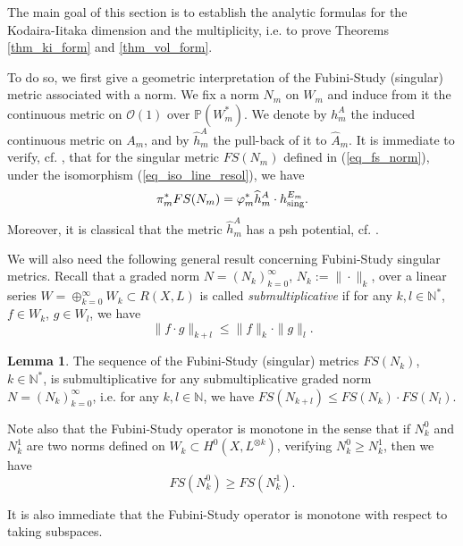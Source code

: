 \documentclass[12pt]{article}
\numberwithin{equation}{section}
\theoremstyle{theorem}
\theoremstyle{definition}
\newtheorem{lem}[thm]{Lemma}
\theoremstyle{remark}
\newcommand{\nat}{\mathbb{N}}
\begin{document}
	The main goal of this section is to establish the analytic formulas for the Kodaira-Iitaka dimension and the multiplicity, i.e. to prove Theorems \ref{thm_ki_form} and \ref{thm_vol_form}.
	\par 
	To do so, we first give a geometric interpretation of the Fubini-Study (singular) metric associated with a norm.
	We fix a norm $N_m$ on $W_m$ and induce from it the continuous metric on $\mathscr{O}(1)$ over $\mathbb{P}(W_m^*)$.
	We denote by $h^A_m$ the induced continuous metric on $A_m$, and by $\widehat{h}^A_m$ the pull-back of it to $\widehat{A}_m$.
	It is immediate to verify, cf. \cite[(3.10)]{FinGQBig}, that for the singular metric $FS(N_m)$ defined in (\ref{eq_fs_norm}), under the isomorphism (\ref{eq_iso_line_resol}), we have
	\begin{equation}\label{eq_fs_n_k_a_k_rel}
		\pi_m^* FS(N_m)
		=
		\varphi_m^*
		\widehat{h}^A_m
		\cdot
		h^{E_m}_{{\rm{sing}}}.
	\end{equation}
	Moreover, it is classical that the metric $\widehat{h}^A_m$ has a psh potential, cf. \cite[Theorem 4.1]{KobFinNeg}.
	\par 
	We will also need the following general result concerning Fubini-Study singular metrics.
	Recall that a graded norm $N = (N_k)_{k = 0}^{\infty}$, $N_k := \| \cdot \|_k$, over a linear series $W = \oplus_{k = 0}^{\infty} W_k \subset R(X, L)$ is called \textit{submultiplicative} if for any $k, l \in \nat^*$, $f \in W_k$, $g \in W_l$, we have
	\begin{equation}\label{eq_subm_s_ring}
		\| f \cdot g \|_{k + l} \leq 
		\| f \|_k \cdot
		\| g \|_l.
	\end{equation}
	\begin{lem}\label{lem_fs_sm}
		The sequence of the Fubini-Study (singular) metrics $FS(N_k)$, $k \in \nat^*$, is submultiplicative for any submultiplicative graded norm $N = (N_k)_{k = 0}^{\infty}$, i.e. for any $k, l \in \nat$, we have $FS(N_{k + l}) \leq FS(N_k) \cdot FS(N_l)$.
	\end{lem}
	\par 
	Note also that the Fubini-Study operator is monotone in the sense that if $N_k^0$ and $N_k^1$ are two norms defined on $W_k \subset H^0(X, L^{\otimes k})$, verifying $N_k^0 \geq N_k^1$, then we have
	\begin{equation}\label{eq_fs_monoton}
		FS(N_k^0) \geq FS(N_k^1).
	\end{equation}
	\par 
	It is also immediate that the Fubini-Study operator is monotone with respect to taking subspaces.
\end{document}
